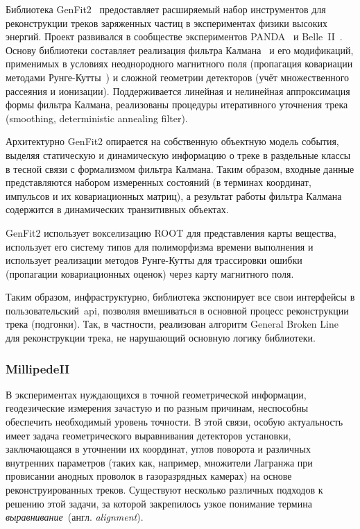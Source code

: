 Библиотека GenFit2~\cite{Genfit2_Rauch_2015} предоставляет расширяемый
набор инструментов для реконструкции треков заряженных частиц
в экспериментах физики высоких энергий. Проект развивался
в сообществе экспериментов PANDA~\cite{panda-collaboration} и
Belle~II~\cite{belle-ii}. Основу библиотеки составляет реализация
фильтра Калмана~\cite{kalman-1960} и его модификаций,
применимых в условиях неоднородного
магнитного поля (пропагация ковариации методами Рунге-Кутты~\cite{StrandlieJacobians}) и
сложной геометрии детекторов (учёт множественного рассеяния и ионизации).
Поддерживается линейная и нелинейная аппроксимация формы фильтра
Калмана, реализованы процедуры итеративного уточнения трека (smoothing,
deterministic annealing filter).

Архитектурно GenFit2 опирается на собственную объектную модель события,
выделяя статическую и динамическую информацию о треке в раздельные классы
в тесной связи с формализмом фильтра Калмана. Таким образом, входные
данные представляются набором измеренных состояний (в терминах координат,
импульсов и их ковариационных матриц), а результат работы фильтра Калмана
содержится в динамических транзитивных объектах.

GenFit2 использует вокселизацию ROOT для представления карты вещества,
использует его систему типов для полиморфизма времени выполнения и использует
реализации методов Рунге-Кутты для трассировки ошибки (пропагации
ковариационных оценок) через карту магнитного поля.

Таким образом, инфраструктурно, библиотека экспонирует все свои интерфейсы в
пользовательский~\acrshort{api}, позволяя вмешиваться в основной процесс
реконструкции трека (подгонки). Так, в частности, реализован алгоритм
General Broken Line~\cite{gbp-kleinwort} для реконструкции трека,
не нарушающий основную логику библиотеки.

\subsubsection{MillipedeII}

В экспериментах нуждающихся в точной геометрической информации,
геодезические измерения зачастую и по разным причинам, неспособны обеспечить
необходимый уровень точности. В этой связи, особую актуальность имеет
задача геометрического выравнивания детекторов установки,
заключающаяся в уточнении их координат, углов поворота и различных
внутренних параметров (таких как, например, множители Лагранжа
при провисании анодных проволок в газоразрядных камерах) на основе
реконструированных треков. Существуют несколько различных подходов
к решению этой задачи, за которой закрепилось узкое понимание
термина \emph{выравнивание}~(англ. \emph{alignment}).

